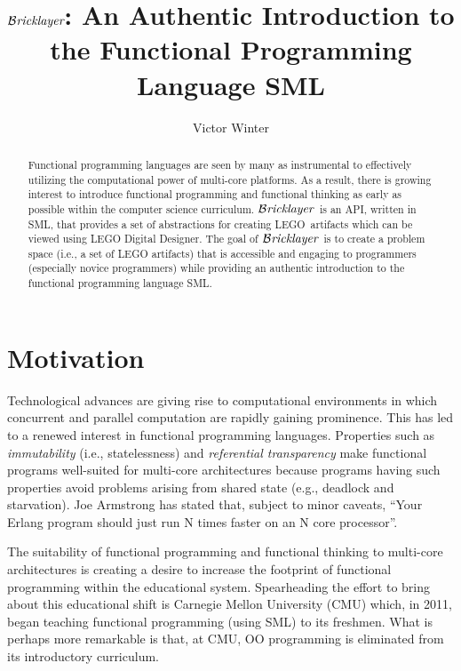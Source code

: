 \documentclass[submission,copyright,creativecommons]{eptcs}
\newcommand{\bricklayer}{\ensuremath{\mathcal{B}\emph{ricklayer}}}
\begin{document}
\title{\bricklayer: An Authentic Introduction to the Functional Programming Language SML}

\author{Victor Winter
}



\maketitle
\begin{abstract}
Functional programming languages are seen by many as instrumental to effectively utilizing the computational power of multi-core platforms. As a result, there is growing interest to introduce functional programming and functional thinking as early as possible within the computer science curriculum. \bricklayer\ is an API, written in SML, that provides a set of abstractions for creating LEGO\textregistered\ artifacts which can be viewed using LEGO Digital Designer. The goal of \bricklayer\ is to create a problem space (i.e., a set of LEGO artifacts) that is accessible and engaging to programmers (especially novice programmers) while providing an authentic introduction to the functional programming language SML.
\end{abstract}





\section{Motivation}



Technological advances are giving rise to computational environments in which concurrent and parallel computation are rapidly gaining prominence. This has led to a renewed interest in functional programming languages. Properties such as \emph{immutability} (i.e., statelessness) and \emph{referential transparency} make functional programs well-suited for multi-core architectures because  programs having such properties avoid problems arising from shared state (e.g., deadlock and starvation). Joe Armstrong has stated that, subject to minor caveats, ``Your Erlang program should just run N times faster on an N core processor''.\cite{Armstrong:Erlang}

The suitability of functional programming and functional thinking to multi-core architectures is creating a desire to increase the footprint of functional programming within the educational system. Spearheading the effort to bring about this educational shift is Carnegie Mellon University (CMU) which, in 2011, began teaching functional programming (using SML) to its freshmen. What is perhaps more remarkable is that, at CMU, OO programming is eliminated from its introductory curriculum.
\end{document}

